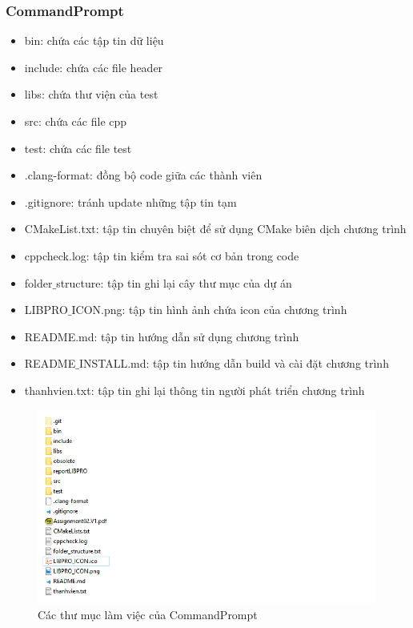 \documentclass[12pt,a4paper]{report}
\begin{document}
            \subsubsection{CommandPrompt}
            \begin{itemize}
                \item bin: chứa các tập tin dữ liệu
                \item include: chứa các file header
                \item libs: chứa thư viện của test
                \item src: chứa các file cpp
                \item test: chứa các file test
                \item .clang-format: đồng bộ code giữa các thành viên
                \item .gitignore: tránh update những tập tin tạm
                \item CMakeList.txt: tập tin chuyên biệt để sử dụng CMake biên dịch chương trình
                \item cppcheck.log: tập tin kiểm tra sai sót cơ bản trong code
                \item folder$\_$structure: tập tin ghi lại cây thư mục của dự án
                \item LIBPRO$\_$ICON.png: tập tin hình ảnh chứa icon của chương trình
                \item README.md: tập tin hướng dẫn sử dụng chương trình
                \item README$\_$INSTALL.md: tập tin hướng dẫn build và cài đặt chương trình
                \item thanhvien.txt: tập tin ghi lại thông tin người phát triển chương trình
            \end{itemize}
            \begin{figure}[H]
                \centering

                \label{F:commandfolder}
                \includegraphics[scale = 1]{commandfolder.png}
                \caption{Các thư mục làm việc của CommandPrompt}
            \end{figure}
\end{document}

